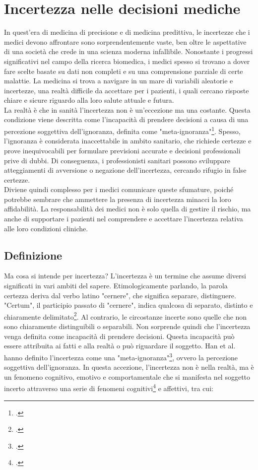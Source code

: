 \chapter{Incertezza nelle decisioni mediche}
\label{cap:incertezza-decisioni-mediche}

In quest'era di medicina di precisione e di medicina predittiva, le incertezze che i medici devono affrontare sono sorprendentemente vaste, ben oltre le aspettative di una società che crede in una scienza moderna infallibile. Nonostante i progressi significativi nel campo della ricerca biomedica, i medici spesso si trovano a dover fare scelte basate su dati non completi e su una comprensione parziale di certe malattie. La medicina si trova a navigare in un mare di variabili aleatorie e incertezze, una realtà difficile da accettare per i pazienti, i quali cercano risposte chiare e sicure riguardo alla loro salute attuale e futura.\\
La realtà è che in sanità l'incertezza non è un'eccezione ma una costante. Questa condizione viene descritta come l'incapacità di prendere decisioni a causa di una percezione soggettiva dell'ignoranza, definita come "meta-ignoranza"\footcite{womak:meta-ignoranza}. Spesso, l'ignoranza è considerata inaccettabile in ambito sanitario, che richiede certezze e prove inequivocabili per formulare previsioni accurate e decisioni professionali prive di dubbi. Di conseguenza, i professionisti sanitari possono sviluppare atteggiamenti di avversione o negazione dell'incertezza, cercando rifugio in false certezze.\\
Diviene quindi complesso per i medici comunicare queste sfumature, poiché potrebbe sembrare che ammettere la presenza di incertezza minacci la loro affidabilità. La responsabilità dei medici non è solo quella di gestire il rischio, ma anche di supportare i pazienti nel comprendere e accettare l'incertezza relativa alle loro condizioni cliniche.

\section{Definizione}

Ma cosa si intende per incertezza? L'incertezza è un termine che assume diversi significati in vari ambiti del sapere. Etimologicamente parlando, la parola certezza deriva dal verbo latino "cernere", che significa separare, distinguere. "Certum", il participio passato di "cernere", indica qualcosa di separato, distinto e chiaramente delimitato\footcite{womak:recenti-progressi-medicina}. Al contrario, le circostanze incerte sono quelle che non sono chiaramente distinguibili o separabili. Non sorprende quindi che l'incertezza venga definita come incapacità di prendere decisioni. Questa incapacità può essere attribuita ai fatti e alla realtà o può riguardare il soggetto. Han et al. hanno definito l'incertezza come una "meta-ignoranza"\footcite{womak:meta-ignoranza}, ovvero la percezione soggettiva dell'ignoranza. In questa accezione, l'incertezza non è nella realtà, ma è un fenomeno cognitivo, emotivo e comportamentale che si manifesta nel soggetto incerto attraverso una serie di fenomeni cognitivi\footcite{womak:recenti-progressi-medicina} e affettivi, tra cui:

